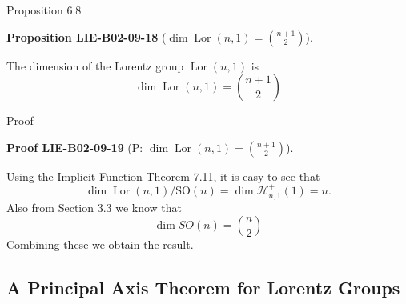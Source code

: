 \documentclass[10pt, letterpaper]{article}
\newcommand{\CustomHeading}[3]{%
  \par\medskip\noindent%
  \textbf{#1 #2} \textnormal{(#3)}.\enskip%
}
\newenvironment{PROP}[2]{\begin{unitbox}\CustomHeading{Proposition}{#1}{#2}}{\end{unitbox}}
\newenvironment{PROOF}[2]{\begin{unitbox}\CustomHeading{Proof}{#1}{#2}}{\end{unitbox}}
\begin{document}
Proposition 6.8


\begin{PROP}{LIE-B02-09-18}{$\operatorname{dim} \operatorname{Lor}(n, 1)=\binom{n+1}{2}$}
The dimension of the Lorentz group $\operatorname{Lor}(n, 1)$ is
$$
\operatorname{dim} \operatorname{Lor}(n, 1)=\binom{n+1}{2}
$$
\end{PROP}


Proof


\begin{PROOF}{LIE-B02-09-19}{P: $\operatorname{dim} \operatorname{Lor}(n, 1)=\binom{n+1}{2}$}
Using the Implicit Function Theorem 7.11, it is easy to see that
$$
\operatorname{dim} \operatorname{Lor}(n, 1) / \mathrm{SO}(n)=\operatorname{dim} \mathcal{H}_{n, 1}^{+}(1)=n .
$$
Also from Section 3.3 we know that
$$
\operatorname{dim} S O(n)=\binom{n}{2}
$$
Combining these we obtain the result.
\end{PROOF}


\pagebreak


\subsection{A Principal Axis Theorem for Lorentz Groups}
\end{document}
